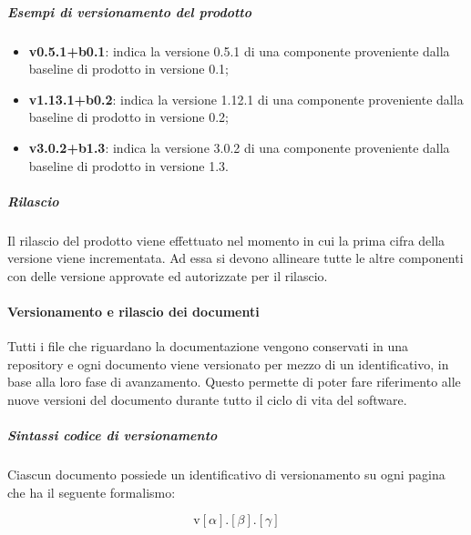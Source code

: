 		\subparagraph{Esempi di versionamento del prodotto}

		\begin{itemize}
			\item \textbf{v0.5.1+b0.1}: indica la versione 0.5.1 di una componente proveniente dalla baseline di prodotto in versione 0.1;
			\item \textbf{v1.13.1+b0.2}:  indica la versione 1.12.1 di una componente proveniente dalla baseline di prodotto in versione 0.2;
			\item \textbf{v3.0.2+b1.3}: indica la versione 3.0.2 di una componente proveniente dalla baseline di prodotto in versione 1.3.
		\end{itemize}

		\subparagraph{Rilascio}

		Il rilascio del prodotto viene effettuato nel momento in cui la prima cifra della versione viene incrementata. Ad essa si devono allineare tutte le altre componenti con delle versione approvate ed autorizzate per il rilascio. 

	\paragraph{Versionamento e rilascio dei documenti}

	Tutti i file che riguardano la documentazione vengono conservati in una repository e ogni documento viene versionato per mezzo di un identificativo, in base alla loro fase di avanzamento. Questo permette di poter fare riferimento alle nuove versioni del documento durante tutto il ciclo di vita del software.

		\subparagraph{Sintassi codice di versionamento}

		Ciascun documento possiede un identificativo di versionamento su ogni pagina che ha il seguente formalismo:

		\[%
			\text{v}[\alpha].[\beta].[\gamma]
		\]


